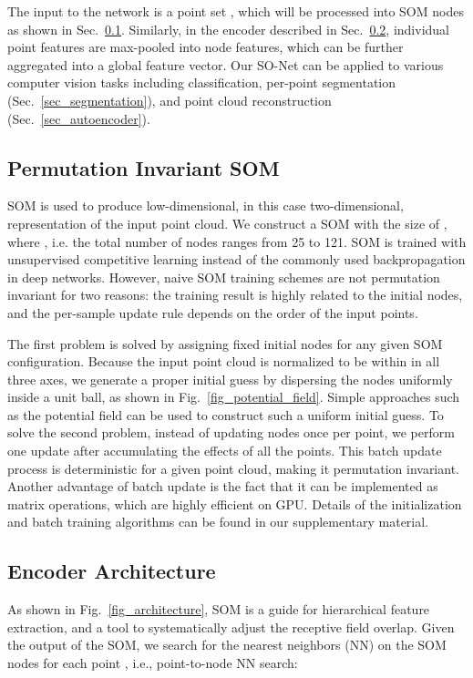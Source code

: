 \documentclass[10pt,twocolumn,letterpaper]{article}
\begin{document}
The input to the network is a point set , which will be processed into  SOM nodes  as shown in Sec.~\ref{sec_som}. Similarly, in the encoder described in Sec.~\ref{sec_encoder}, individual point features are max-pooled into  node features, which can be further aggregated into a global feature vector. Our SO-Net can be applied to various computer vision tasks including classification, per-point segmentation (Sec.~\ref{sec_segmentation}), and point cloud reconstruction (Sec.~\ref{sec_autoencoder}).

\subsection{Permutation Invariant SOM} \label{sec_som}

SOM is used to produce low-dimensional, in this case two-dimensional, representation of the input point cloud. We construct a SOM with the size of , where , i.e. the total number of nodes  ranges from 25 to 121. SOM is trained with unsupervised competitive learning instead of the commonly used backpropagation in deep networks. However, naive SOM training schemes are not permutation invariant for two reasons: the training result is highly related to the initial nodes, and the per-sample update rule depends on the order of the input points. 

The first problem is solved by assigning fixed initial nodes for any given SOM configuration. Because the input point cloud is normalized to be within  in all three axes, we generate a proper initial guess by dispersing the nodes uniformly inside a unit ball, as shown in Fig.~\ref{fig_potential_field}. Simple approaches such as the potential field can be used to construct such a uniform initial guess. To solve the second problem, instead of updating nodes once per point, we perform one update after accumulating the effects of all the points. This batch update process is deterministic \cite{kohonen1998self} for a given point cloud, making it permutation invariant. Another advantage of batch update is the fact that it can be implemented as matrix operations, which are highly efficient on GPU. Details of the initialization and batch training algorithms can be found in our supplementary material.

\subsection{Encoder Architecture} \label{sec_encoder}
As shown in Fig.~\ref{fig_architecture}, SOM is a guide for hierarchical feature extraction, and a tool to systematically adjust the receptive field overlap. Given the output of the SOM, we search for the  nearest neighbors (NN) on the SOM nodes  for each point , i.e., point-to-node NN search:
\end{document}
